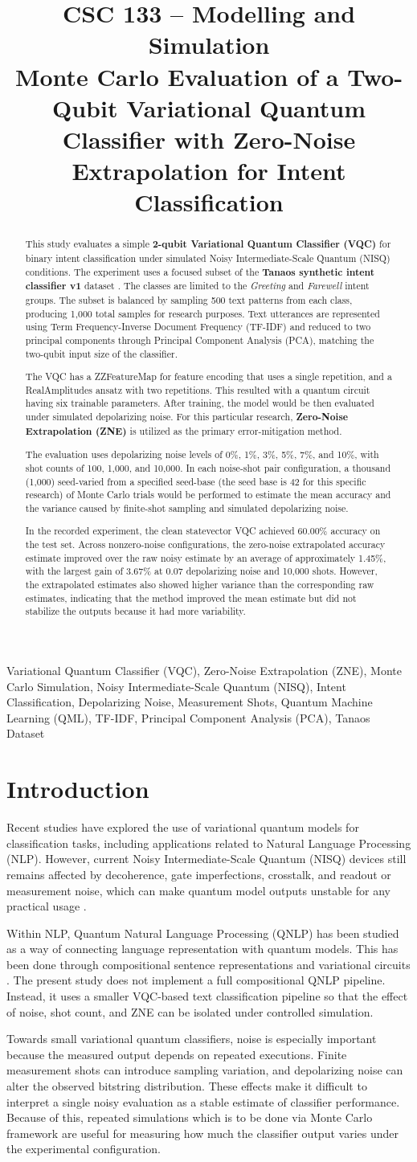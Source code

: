 \documentclass[conference]{IEEEtran}
\title{%
{\normalfont\normalsize\color{gray} CSC 133 -- Modelling and Simulation}\\[2.2em]%
Monte Carlo Evaluation of a Two-Qubit Variational Quantum Classifier
with Zero-Noise Extrapolation for Intent Classification
}
\author{
  \IEEEauthorblockN{John-Ronan S. Beira\textsuperscript{1 a *}}
  \IEEEauthorblockA{
    \textsuperscript{1}Bongao Alliance Church, Datu Halun Street, Bongao, Tawi-Tawi, Philippines\\
    \href{mailto:john-ronan.beira@g.msuiit.edu.ph}{\textsuperscript{a} john-ronan.beira@g.msuiit.edu.ph} / 
    \href{mailto:johnronanbeira100404@gmail.com}{johnronanbeira100404@gmail.com}
  }
}
\def\myabstract{%
\mdseries
This study evaluates a simple \textbf{2-qubit Variational Quantum Classifier (VQC)}
for binary intent classification under simulated Noisy Intermediate-Scale Quantum
(NISQ) conditions. The experiment uses a focused subset of the
\textbf{Tanaos synthetic intent classifier v1} dataset \cite{b_tanaos_dataset}.
The classes are limited to the \emph{Greeting} and \emph{Farewell} intent groups.
The subset is balanced by sampling 500 text patterns from each class, producing
1{,}000 total samples for research purposes. Text utterances are represented using
Term Frequency-Inverse Document Frequency (TF-IDF) 
and reduced to two principal components through Principal Component
Analysis (PCA), matching the two-qubit input size of the classifier.

The VQC has a ZZFeatureMap for feature encoding that uses a single repetition, and a
RealAmplitudes ansatz with two repetitions. This resulted with a quantum circuit having six trainable
parameters. After training, the model would be then evaluated under simulated
depolarizing noise. For this particular research, \textbf{Zero-Noise Extrapolation (ZNE)} 
is utilized as the primary error-mitigation method. 

The evaluation uses depolarizing noise
levels of 0\%, 1\%, 3\%, 5\%, 7\%, and 10\%, with shot counts of
100, 1{,}000, and 10{,}000. In each noise-shot pair configuration, a thousand (1{,}000)
seed-varied from a specified seed-base (the seed base is 42 for this specific research) of Monte Carlo 
trials would be performed to estimate the mean accuracy and
the variance caused by finite-shot sampling and simulated depolarizing noise.

In the recorded experiment, the clean statevector VQC achieved
60.00\% accuracy on the test set. Across nonzero-noise configurations, the zero-noise extrapolated accuracy
estimate improved over the raw noisy estimate by an average of
approximately 1.45\%, with the largest gain of 3.67\%
at 0.07 depolarizing noise and 10,000 shots. However, the extrapolated
estimates also showed higher variance than the corresponding raw
estimates, indicating that the method improved the mean estimate but did
not stabilize the outputs because it had more variability.
}
\def\mykeywords{%
  \mdseries
  Variational Quantum Classifier (VQC), Zero-Noise Extrapolation (ZNE),
  Monte Carlo Simulation, Noisy Intermediate-Scale Quantum (NISQ),
  Intent Classification, Depolarizing Noise, Measurement Shots,
  Quantum Machine Learning (QML), TF-IDF,
  Principal Component Analysis (PCA), Tanaos Dataset%
}
\begin{document}
\raggedbottom

\maketitle

\begin{abstract}
  \myabstract
\end{abstract}

\begin{IEEEkeywords}
  \mykeywords
\end{IEEEkeywords}

\section{Introduction}
\label{sec:introduction}

Recent studies have explored the use of variational quantum models for
classification tasks, including applications related to Natural Language
Processing (NLP). However, current Noisy Intermediate-Scale Quantum (NISQ)
devices still remains affected by decoherence, gate imperfections, crosstalk, and
readout or measurement noise, which can make quantum model outputs unstable for
any practical usage \cite{b_njiki2026, b_koenig2024}.

Within NLP, Quantum Natural Language Processing (QNLP) has been studied as a
way of connecting language representation with quantum models. This has been done 
through compositional sentence representations and variational
circuits \cite{b_phukan2025, b_guarasci2022, b_lorenz2023}. The present study
does not implement a full compositional QNLP pipeline. Instead, it uses a
smaller VQC-based text classification pipeline so that the effect of noise, shot
count, and ZNE can be isolated under controlled simulation.

Towards small variational quantum classifiers, noise is especially important because
the measured output depends on repeated executions. Finite measurement
shots can introduce sampling variation, and depolarizing noise can alter the
observed bitstring distribution. These effects make it difficult to interpret a
single noisy evaluation as a stable estimate of classifier performance. Because
of this, repeated simulations which is to be done via Monte Carlo framework are useful for measuring how much the
classifier output varies under the experimental configuration.
\end{document}

